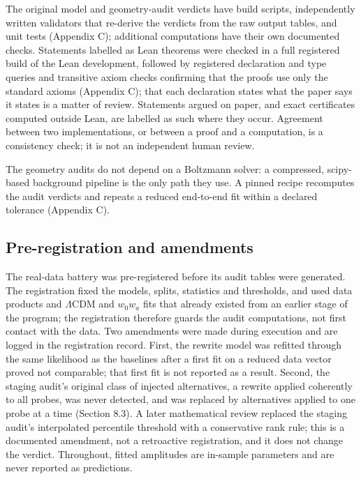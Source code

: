 The original model and geometry-audit verdicts have build scripts,
independently written validators that re-derive the verdicts from the
raw output tables, and unit tests (Appendix C); additional computations
have their own documented checks. Statements labelled as Lean theorems
were checked in a full registered build of the Lean development,
followed by registered declaration and type queries and transitive axiom
checks confirming that the proofs use only the standard axioms (Appendix
C); that each declaration states what the paper says it states is a
matter of review. Statements argued on paper, and exact certificates
computed outside Lean, are labelled as such where they occur. Agreement
between two implementations, or between a proof and a computation, is a
consistency check; it is not an independent human review.

The geometry audits do not depend on a Boltzmann solver: a compressed,
scipy-based background pipeline is the only path they use. A pinned
recipe recomputes the audit verdicts and repeats a reduced end-to-end
fit within a declared tolerance (Appendix C).

\hypertarget{pre-registration-and-amendments}{%
\subsection{Pre-registration and
amendments}\label{pre-registration-and-amendments}}

The real-data battery was pre-registered before its audit tables were
generated. The registration fixed the models, splits, statistics and
thresholds, and used data products and \(\Lambda\)CDM and \(w_0w_a\)
fits that already existed from an earlier stage of the program; the
registration therefore guards the audit computations, not first contact
with the data. Two amendments were made during execution and are logged
in the registration record. First, the rewrite model was refitted
through the same likelihood as the baselines after a first fit on a
reduced data vector proved not comparable; that first fit is not
reported as a result. Second, the staging audit's original class of
injected alternatives, a rewrite applied coherently to all probes, was
never detected, and was replaced by alternatives applied to one probe at
a time (Section 8.3). A later mathematical review replaced the staging
audit's interpolated percentile threshold with a conservative rank rule;
this is a documented amendment, not a retroactive registration, and it
does not change the verdict. Throughout, fitted amplitudes are in-sample
parameters and are never reported as predictions.
